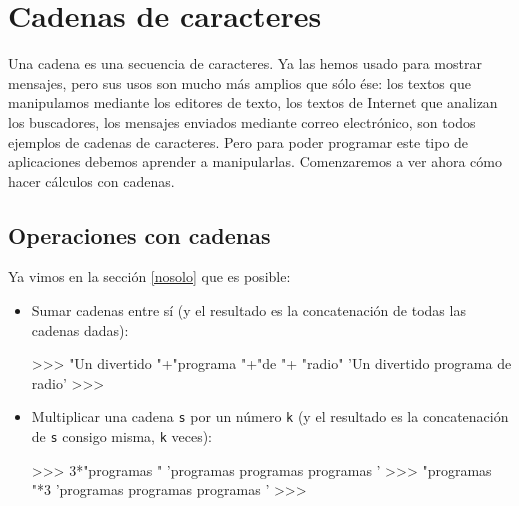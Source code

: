 
%

\chapter{Cadenas de caracteres}

Una cadena es una secuencia de caracteres. Ya las hemos usado para mostrar
mensajes, pero sus usos son mucho más amplios que sólo ése: los textos que
manipulamos mediante los editores de texto, los textos de Internet que
analizan los buscadores, los mensajes enviados mediante correo electrónico,
son todos ejemplos de cadenas de caracteres. Pero para poder programar este
tipo de aplicaciones debemos aprender a manipularlas. Comenzaremos a ver
ahora cómo hacer cálculos con cadenas.

\section{Operaciones con cadenas}

Ya vimos en la sección \ref{nosolo} que es posible:

\begin{itemize}
\item Sumar cadenas entre sí (y el resultado es la concatenación
de todas las cadenas dadas):

\begin{codigo-python-sn}
>>> "Un divertido "+"programa "+"de "+ "radio"
'Un divertido programa de radio'
>>>
\end{codigo-python-sn}

\item Multiplicar una cadena \lstinline+s+ por un número \lstinline+k+ (y
el resultado es la concatenación de \lstinline+s+ consigo misma,
\lstinline+k+ veces):

\begin{codigo-python-sn}
>>> 3*"programas "
'programas programas programas '
>>> "programas "*3
'programas programas programas '
>>>
\end{codigo-python-sn}
\end{itemize}

